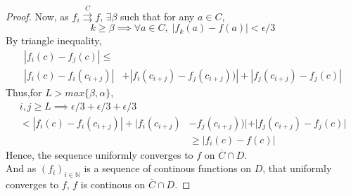 \documentclass[20pt,a4paper]{extarticle} %
\begin{document}
\begin{proof}
	Now, as $f_i \overset{C}{\rightrightarrows} f$, $\exists \beta$ such that
	for any $a \in C$,
	\begin{equation*}
		k \geq \beta \implies \forall a \in C, \; |f_k(a) - f(a)| < \epsilon/3
	\end{equation*}
	By triangle inequality,
	\begin{align*}
		|f_i(c) - f_j(c)| \leq &\\
		|f_i(c) - f_i(c_{i+j})| &+ |f_i(c_{i+j}) - f_j(c_{i+j}))|+|f_j(c_{i+j}) - f_j(c)|
	\end{align*}
	Thus,for $L > max\{ \beta , \alpha \}$,
	\begin{align*}
		i,j \geq L \implies \epsilon/3 +\epsilon/3 +\epsilon/3 & \\
		<|f_i(c) - f_i(c_{i+j})| + |f_i(c_{i+j}) &- f_j(c_{i+j}))|+|f_j(c_{i+j}) - f_j(c)| \\
							 &\geq |f_i(c) - f(c) |
	\end{align*}
	Hence, the sequence uniformly converges to $f$ on $\overline{C}\cap D$.\\
	And as $(f_i)_{i \in \mathbb{N}}$ is a sequence of continous functions on $D$, that uniformly converges to $f$,
	$f$ is continous on $\overline{C}\cap D$.
\end{proof}
	\pagebreak
\end{document}
